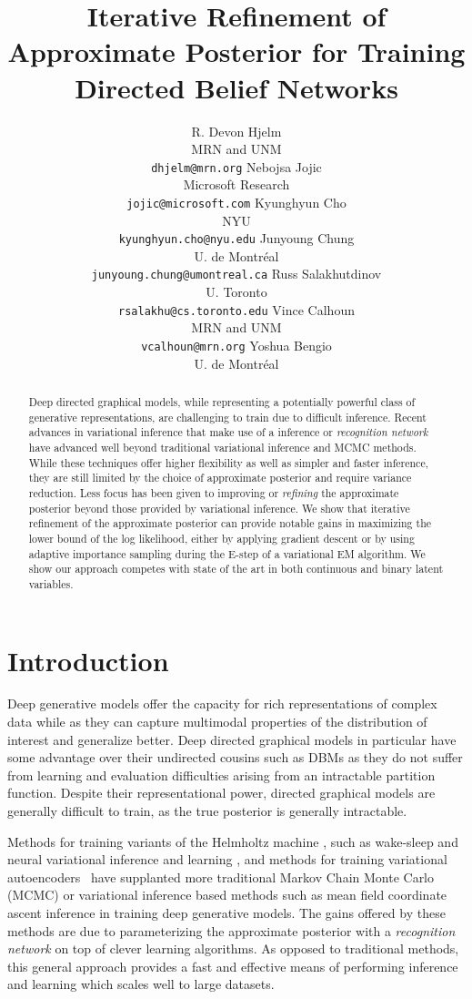 \documentclass{article} %
\title{Iterative Refinement of Approximate Posterior for Training Directed Belief Networks}
\author{R. Devon Hjelm \\
MRN and UNM \\
\texttt{dhjelm@mrn.org} 
\And
Nebojsa Jojic \\
Microsoft Research \\
\texttt{jojic@microsoft.com}
\And
Kyunghyun Cho \\
NYU \\
\texttt{kyunghyun.cho@nyu.edu}
\And
Junyoung Chung \\
U. de Montr\'{e}al \\
\texttt{junyoung.chung@umontreal.ca}
\And
Russ Salakhutdinov \\
U. Toronto \\
\texttt{rsalakhu@cs.toronto.edu}
\And
Vince Calhoun \\
MRN and UNM \\
\texttt{vcalhoun@mrn.org}
\And
Yoshua Bengio \\
U. de Montr\'{e}al
}
\begin{document}
\maketitle

\begin{abstract}
    Deep directed graphical models, while representing a potentially powerful
    class of generative representations, are challenging to train due to
    difficult inference. Recent advances in variational inference that make use
    of a inference or \emph{recognition network} have advanced well beyond
    traditional variational inference and MCMC methods. While these techniques
    offer higher flexibility as well as simpler and faster inference, they are
    still limited by the choice of approximate posterior and require variance
    reduction. Less focus has been given to improving or \emph{refining} the
    approximate posterior beyond those provided by variational inference. We
    show that iterative refinement of the approximate posterior can provide
    notable gains in maximizing the lower bound of the log likelihood, either
    by applying gradient descent or by using adaptive importance sampling
    during the E-step of a variational EM algorithm. We show our approach
    competes with state of the art in both continuous and binary latent
    variables.
    \end{abstract}

\section{Introduction}

Deep generative models offer the capacity for rich representations of complex
data while as they can capture multimodal properties of the distribution of
interest and generalize better. Deep directed
graphical models in particular have some advantage over their undirected
cousins such as DBMs \citep{salakhutdinov2009deep} as they do not suffer from
learning and evaluation difficulties arising from an intractable partition
function. Despite their representational power, directed graphical models are
generally difficult to train, as the true posterior is generally intractable.

Methods for training variants of the Helmholtz machine
\citep{dayan1995helmholtz}, such as wake-sleep \citep{hinton1995wake,
bornschein2014reweighted} and neural variational inference and learning
\citep[NVIL,][]{mnih2014neural}, and methods for training variational autoencoders~
\citep[VAE,][]{kingma2013auto} have supplanted more traditional Markov Chain Monte
Carlo (MCMC) or variational inference based methods such as mean field
coordinate ascent inference in training deep generative models. The gains
offered by these methods are due to parameterizing the approximate posterior
with a \emph{recognition network} on top of clever learning algorithms. As
opposed to traditional methods, this general approach provides a fast and
effective means of performing inference and learning which scales well to large
datasets.
\end{document}
